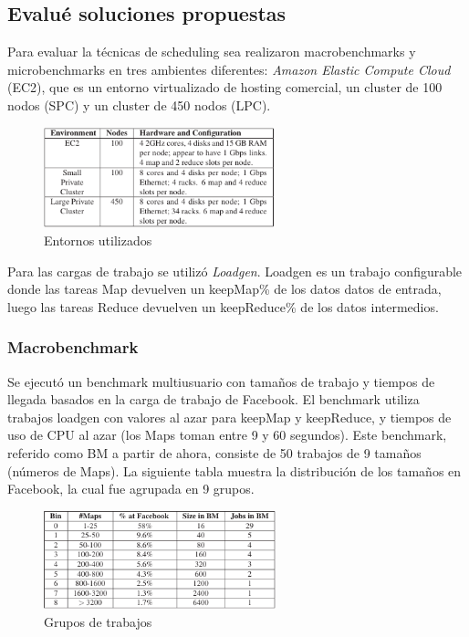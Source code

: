 \subsection{Evalué soluciones propuestas}

Para evaluar la técnicas de scheduling sea realizaron macrobenchmarks y microbenchmarks en tres ambientes diferentes: \textit{Amazon Elastic Compute Cloud} (EC2), que es un entorno virtualizado de hosting comercial, un cluster de 100 nodos (SPC) y un cluster de 450 nodos (LPC).

\begin{figure}[H]
\begin{center}
\includegraphics[width=0.6\textwidth]{img/img1.png}
     \caption{Entornos utilizados}
\end{center}
\end{figure}

Para las cargas de trabajo se utilizó \textit{Loadgen}. Loadgen es un trabajo configurable donde las tareas Map devuelven un keepMap\% de los datos datos de entrada, luego las tareas Reduce devuelven un keepReduce\% de los datos intermedios.


\subsubsection{Macrobenchmark}

Se ejecutó un benchmark multiusuario con tamaños de trabajo y tiempos de llegada basados en la carga de trabajo de Facebook. El benchmark utiliza trabajos loadgen con valores al azar para keepMap y keepReduce, y tiempos de uso de CPU al azar (los Maps toman entre 9 y 60 segundos). Este benchmark, referido como BM a partir de ahora, consiste de 50 trabajos de 9 tamaños (números de Maps). La siguiente tabla muestra la distribución de los tamaños en Facebook, la cual fue agrupada en 9 grupos.

\begin{figure}[H]
\begin{center}
\includegraphics[width=0.6\textwidth]{img/img2.png}
     \caption{Grupos de trabajos}
\end{center}
\end{figure}

